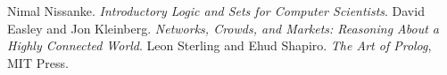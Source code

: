 \begin{thebibliography}{ABC}	
     Nimal Nissanke. \emph{Introductory Logic and Sets for Computer Scientists}.
     David Easley and Jon Kleinberg. \emph{Networks, Crowds, and Markets: Reasoning About a Highly Connected World}.
     Leon Sterling and Ehud Shapiro. \emph{The Art of Prolog}, MIT Press.
\end{thebibliography}
